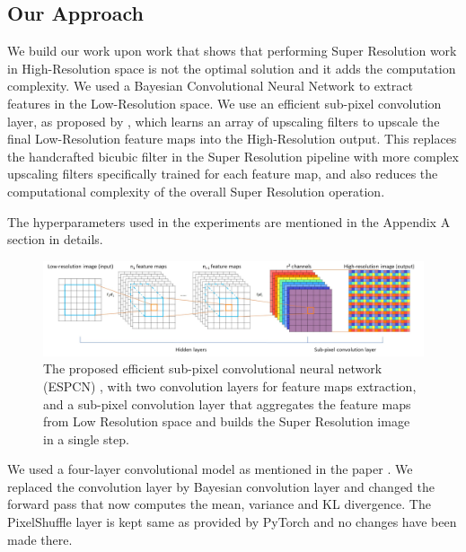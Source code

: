 \subsection{Our Approach}

We build our work upon \citet{DBLP:journals/corr/ShiCHTABRW16} work that shows that performing Super Resolution work in High-Resolution space is not the optimal solution and it adds the computation complexity. We used a Bayesian Convolutional Neural Network to extract features in the Low-Resolution space. We use an efficient sub-pixel convolution layer, as proposed by \citet{DBLP:journals/corr/ShiCHTABRW16}, which learns an array of upscaling filters to upscale the final Low-Resolution feature maps into the High-Resolution output. This replaces the handcrafted bicubic filter in the Super Resolution pipeline with more complex upscaling filters specifically trained for each feature map, and also reduces the computational complexity of the overall Super Resolution operation.

The hyperparameters used in the experiments are mentioned in the Appendix A section in details.

\begin{figure}[htbp]
\begin{center}
\includegraphics[width=1.0\linewidth]{Chapter6/Figs/networkstructure.jpg}
\caption{The proposed efficient sub-pixel convolutional neural network (ESPCN) \cite{DBLP:journals/corr/ShiCHTABRW16}, with two convolution layers for feature maps extraction, and a sub-pixel convolution layer that aggregates the feature maps from Low Resolution space and builds the Super Resolution image in a single step.}
\label{fig:networkstructure}
\end{center}
\end{figure}

We used a four-layer convolutional model as mentioned in the paper \cite{DBLP:journals/corr/ShiCHTABRW16}. We replaced the convolution layer by Bayesian convolution layer and changed the forward pass that now computes the mean, variance and KL divergence. The PixelShuffle layer is kept same as provided by PyTorch and no changes have been made there.  

